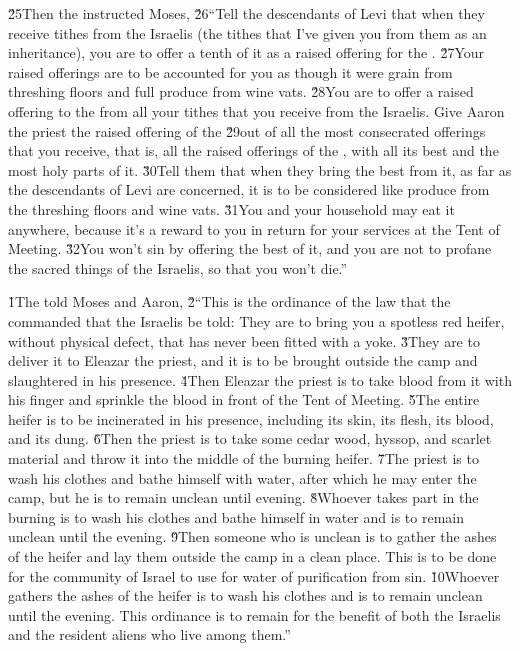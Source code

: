 \v{25}Then the  instructed Moses, \v{26}``Tell the descendants of Levi that when they receive tithes from the Israelis (the tithes that I've given you from them as an inheritance), you are to offer a tenth of it as a raised offering for the . \v{27}Your raised offerings are to be accounted for you as though it were grain from threshing floors and full produce from wine vats. \v{28}You are to offer a raised offering to the  from all your tithes that you receive from the Israelis. Give Aaron the priest the raised offering of the  \v{29}out of all the most consecrated offerings that you receive, that is, all the raised offerings of the , with all its best and the most holy parts of it. \v{30}Tell them that when they bring the best from it, as far as the descendants of Levi are concerned, it is to be considered like produce from the threshing floors and wine vats. \v{31}You and your household may eat it anywhere, because it's a reward to you in return for your services at the Tent of Meeting. \v{32}You won't sin by offering the best of it, and you are not to profane the sacred things of the Israelis, so that you won't die.''

\v{1}The  told Moses and Aaron, \v{2}``This is the ordinance of the law that the  commanded that the Israelis be told: They are to bring you a spotless red heifer, without physical defect, that has never been fitted with a yoke. \v{3}They are to deliver it to Eleazar the priest, and it is to be brought outside the camp and slaughtered in his presence. \v{4}Then Eleazar the priest is to take blood from it with his finger and sprinkle the blood in front of the Tent of Meeting. \v{5}The entire heifer is to be incinerated in his presence, including its skin, its flesh, its blood, and its dung. \v{6}Then the priest is to take some cedar wood, hyssop, and scarlet material and throw it into the middle of the burning heifer. \v{7}The priest is to wash his clothes and bathe himself with water, after which he may enter the camp, but he is to remain unclean until evening. \v{8}Whoever takes part in the burning is to wash his clothes and bathe himself in water and is to remain unclean until the evening. \v{9}Then someone who is unclean is to gather the ashes of the heifer and lay them outside the camp in a clean place. This is to be done for the community of Israel to use for water of purification from sin. \v{10}Whoever gathers the ashes of the heifer is to wash his clothes and is to remain unclean until the evening. This ordinance is to remain for the benefit of both the Israelis and the resident aliens who live among them.''

